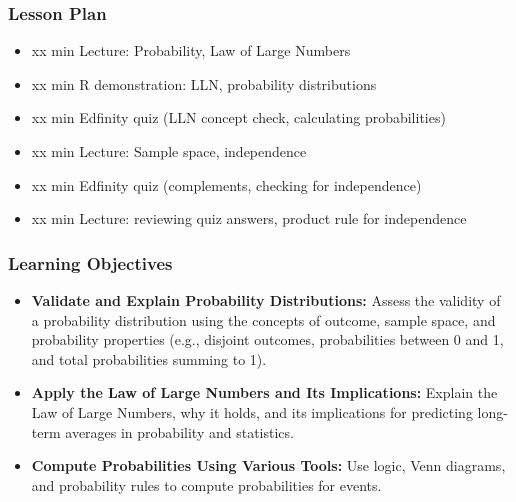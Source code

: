 \begin{frame}
    \frametitle{Lesson Plan}
    \begin{itemize}
        \item xx min Lecture: Probability, Law of Large Numbers
        \item xx min R demonstration: LLN, probability distributions
        \item xx min Edfinity quiz (LLN concept check, calculating probabilities)
        \item xx min Lecture: Sample space, independence
        \item xx min Edfinity quiz (complements, checking for independence)
        \item xx min Lecture: reviewing quiz answers, product rule for independence
    \end{itemize}
\end{frame}

\begin{frame}
    \frametitle{Learning Objectives}
    \begin{itemize}
        \item \textbf{Validate and Explain Probability Distributions:} Assess the validity of a probability distribution using the concepts of outcome, sample space, and probability properties (e.g., disjoint outcomes, probabilities between 0 and 1, and total probabilities summing to 1).
        \item \textbf{Apply the Law of Large Numbers and Its Implications:} Explain the Law of Large Numbers, why it holds, and its implications for predicting long-term averages in probability and statistics.
        \item \textbf{Compute Probabilities Using Various Tools:} Use logic, Venn diagrams, and probability rules to compute probabilities for events.
    \end{itemize}
\end{frame}